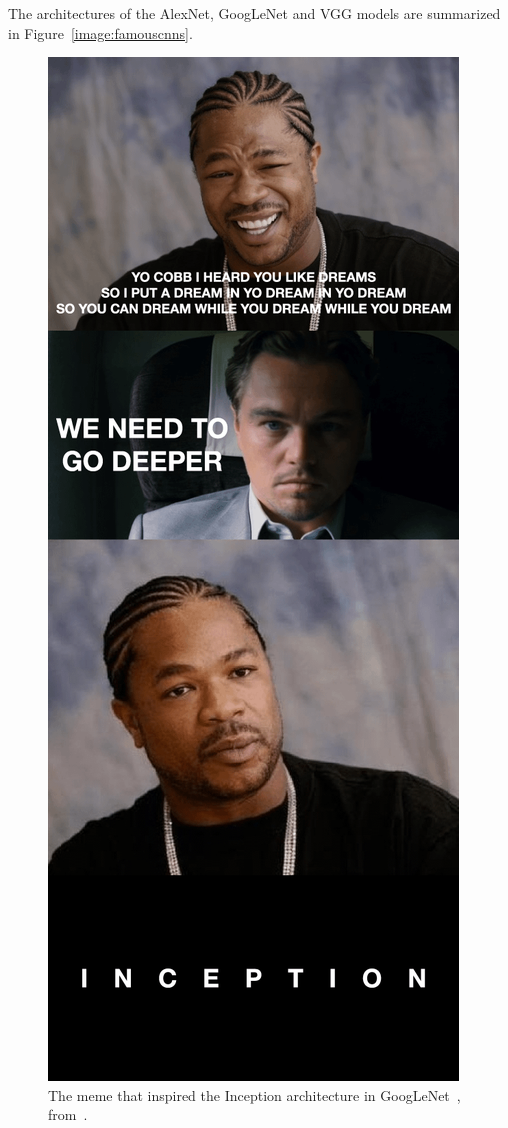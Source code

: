 \documentclass[english,twoside,openright]{UH_DS_MSc}
\begin{document}
The architectures of the AlexNet, GoogLeNet and VGG models are summarized in Figure~\ref{image:famouscnns}.

\begin{figure}[h]
    \centering
    \includegraphics*[scale=0.2]{images/ebd.png}
    \caption{The meme that inspired the Inception architecture in GoogLeNet~\cite{googlelenet}, from~\cite{we_need_to_go_deeper}.}
    \label{image:meme}
\end{figure}
\end{document}
